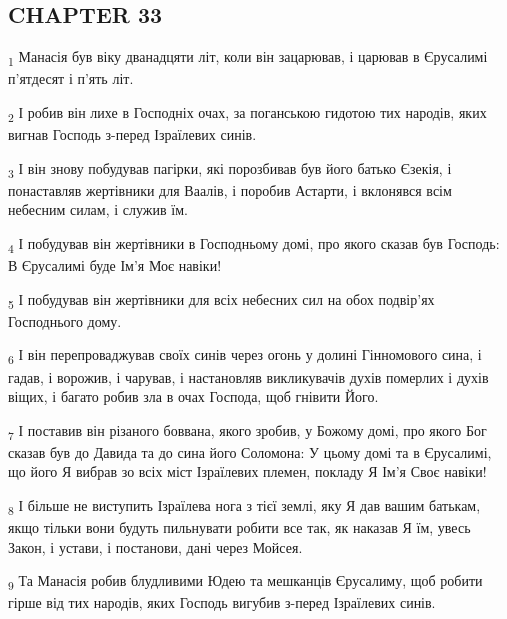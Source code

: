 \subsection{CHAPTER 33}
\begin{tcolorbox}
\textsubscript{1} Манасія був віку дванадцяти літ, коли він зацарював, і царював в Єрусалимі п'ятдесят і п'ять літ.
\end{tcolorbox}
\begin{tcolorbox}
\textsubscript{2} І робив він лихе в Господніх очах, за поганською гидотою тих народів, яких вигнав Господь з-перед Ізраїлевих синів.
\end{tcolorbox}
\begin{tcolorbox}
\textsubscript{3} І він знову побудував пагірки, які порозбивав був його батько Єзекія, і понаставляв жертівники для Ваалів, і поробив Астарти, і вклонявся всім небесним силам, і служив їм.
\end{tcolorbox}
\begin{tcolorbox}
\textsubscript{4} І побудував він жертівники в Господньому домі, про якого сказав був Господь: В Єрусалимі буде Ім'я Моє навіки!
\end{tcolorbox}
\begin{tcolorbox}
\textsubscript{5} І побудував він жертівники для всіх небесних сил на обох подвір'ях Господнього дому.
\end{tcolorbox}
\begin{tcolorbox}
\textsubscript{6} І він перепроваджував своїх синів через огонь у долині Гінномового сина, і гадав, і ворожив, і чарував, і настановляв викликувачів духів померлих і духів віщих, і багато робив зла в очах Господа, щоб гнівити Його.
\end{tcolorbox}
\begin{tcolorbox}
\textsubscript{7} І поставив він різаного боввана, якого зробив, у Божому домі, про якого Бог сказав був до Давида та до сина його Соломона: У цьому домі та в Єрусалимі, що його Я вибрав зо всіх міст Ізраїлевих племен, покладу Я Ім'я Своє навіки!
\end{tcolorbox}
\begin{tcolorbox}
\textsubscript{8} І більше не виступить Ізраїлева нога з тієї землі, яку Я дав вашим батькам, якщо тільки вони будуть пильнувати робити все так, як наказав Я їм, увесь Закон, і устави, і постанови, дані через Мойсея.
\end{tcolorbox}
\begin{tcolorbox}
\textsubscript{9} Та Манасія робив блудливими Юдею та мешканців Єрусалиму, щоб робити гірше від тих народів, яких Господь вигубив з-перед Ізраїлевих синів.
\end{tcolorbox}
